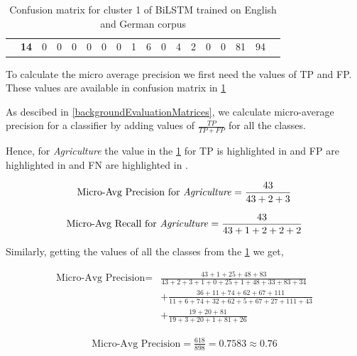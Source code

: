\begin{table}[!ht]
\begin{tabular}{lccccccccccccccccl}
 & \multicolumn{1}{c|}{\textbf{14}} & \multicolumn{1}{c|}{0} & \multicolumn{1}{c|}{0} & \multicolumn{1}{c|}{0} & \multicolumn{1}{c|}{0} & \multicolumn{1}{c|}{0} & \multicolumn{1}{c|}{0} & \multicolumn{1}{c|}{1} & \multicolumn{1}{c|}{6} & \multicolumn{1}{c|}{0} & \multicolumn{1}{c|}{4} & \multicolumn{1}{c|}{2} & \multicolumn{1}{c|}{0} & \multicolumn{1}{c|}{0} & \multicolumn{1}{c|}{81} & 94 &  \\ \cline{3-16}
\end{tabular}
\captionsetup{justification=centering,margin=1cm}
\caption{Confusion matrix for cluster 1 of \gls{BiLSTM} trained on English and German corpus}
\label{table:Confmatrix1}
\end{table}


To calculate the micro average precision we first need the values of \gls{TP} and \gls{FP}. These values are available in confusion matrix in \ref{table:Confmatrix1}

As descibed in \ref{backgroundEvaluationMatrices}, we calculate micro-average precision for a classifier by adding values of $\frac{TP}{TP+FP}$ for all the classes.

Hence, for \textit{Agriculture} the value in the \ref{table:Confmatrix1} for \gls{TP} is highlighted in  and \gls{FP} are highlighted in  and \gls{FN} are highlighted in .

 \begin{align}
    \text{Micro-Avg Precision for \textit{Agriculture}} = \frac{43}{43+2+3} 
\end{align}

 \begin{align}
    \text{Micro-Avg Recall for \textit{Agriculture}} = \frac{43}{43+1+2+2+2} 
\end{align}
 
 
Similarly, getting the values of all the classes from the \ref{table:Confmatrix1} we get,

\begin{align*}
    \text{Micro-Avg Precision} =& \frac{43+1+25+48+83}{43+2+3+1+0+25+1+48+33+83+34} \\
    & + \frac{36+11+74+62+67+111}{11+6+74+32+62+5+67+27+111+43}\\
    & + \frac{19+20+81}{19+3+20+1+81+26}
\end{align*}

\begin{align}
    \text{Micro-Avg Precision} = \frac{618}{898} = 0.7583 \approx 0.76
\end{align}

